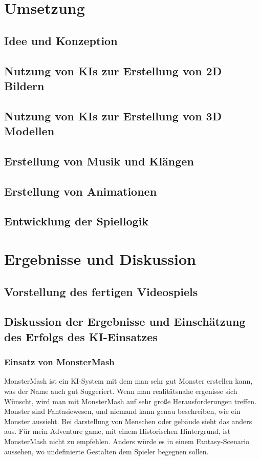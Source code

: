 \documentclass[12pt,a4paper,bibliography=totocnumbered,listof=totocnumbered]{scrartcl}
\begin{document}
\section{Umsetzung}
\subsection {Idee und Konzeption}
\subsection{Nutzung von KIs zur Erstellung von 2D Bildern}
\subsection{Nutzung von KIs zur Erstellung von 3D Modellen}
\subsection{Erstellung von Musik und Klängen}
\subsection{Erstellung von Animationen}
\subsection{Entwicklung der Spiellogik}

\section{Ergebnisse und Diskussion}
\subsection{Vorstellung des fertigen Videospiels}
\subsection{Diskussion der Ergebnisse und Einschätzung des Erfolgs des KI-Einsatzes}
\subsubsection{Einsatz von MonsterMash}
	MonsterMash ist ein KI-System mit dem man sehr gut Monster erstellen kann, was der Name auch gut Suggeriert. Wenn man realitätsnahe ergenisse sich Wünscht, wird man mit MonsterMash auf sehr große Herausforderungen treffen. Monster sind Fantasiewesen, und niemand kann genau beschreiben, wie ein Monster aussieht. Bei darstellung von Menschen oder gebäude sieht das anders aus. Für mein Adventure game, mit einem Historischen Hintergrund, ist MonsterMash nicht zu empfehlen. Anders würde es in einem Fantasy-Scenario aussehen, wo undefinierte Gestalten dem Spieler begegnen sollen.
\end{document}
